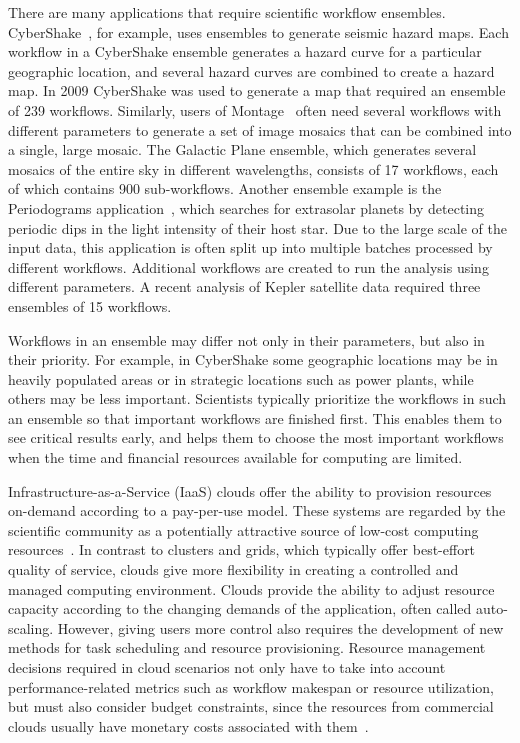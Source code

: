 \documentclass[conference]{IEEEtran}
\begin{document}
There are many applications that require scientific workflow ensembles.
CyberShake~\cite{Callaghan2011}, for example, uses ensembles to generate
seismic hazard maps.  Each workflow in a CyberShake ensemble generates a
hazard curve for a particular geographic location, and several hazard curves
are combined to create a hazard map.  In 2009 CyberShake was used to generate
a map that required an ensemble of 239 workflows.  Similarly, users of
Montage~\cite{Deelman2008} often need several workflows  with different
parameters to generate a set of image mosaics that can be combined  into a
single, large mosaic. The Galactic Plane ensemble, which generates several
mosaics of the  entire sky in different wavelengths, consists of 17 workflows,
each of which contains 900 sub-workflows.  Another ensemble example is the
Periodograms application~\cite{Vockler2011}, which searches for extrasolar
planets by detecting periodic dips in the light intensity of their host star.
Due to the large scale of the input data, this application is often split up
into multiple batches processed by different workflows. Additional workflows
are created to run the analysis using different parameters. A recent analysis
of Kepler satellite data required three ensembles of 15 workflows.

Workflows in an ensemble may differ not only in their parameters, but also in
their priority. For example, in CyberShake some geographic locations may be in heavily
populated areas or in strategic locations such as power plants, while others
may be less important. Scientists typically prioritize the workflows in such
an ensemble so that important workflows are finished first. This enables them
to see critical results early, and helps them to choose the most important
workflows when the time and financial resources available for computing are
limited.

Infrastructure-as-a-Service (IaaS) clouds offer the ability to provision 
resources on-demand according to a pay-per-use model. These systems 
are regarded by the scientific community as a potentially attractive source of 
low-cost computing resources~\cite{Ostermann2010, Keahey2009}. In contrast 
to clusters and grids, which typically offer best-effort quality of service, clouds 
give more flexibility in creating a controlled and managed computing environment.
Clouds provide the ability to adjust resource capacity according to the changing
demands of the application, often called auto-scaling. However, giving users 
more control also requires the development of new methods for task 
scheduling and resource provisioning. Resource management decisions required 
in cloud scenarios not only have to take into account performance-related 
metrics such as workflow makespan or resource utilization, but must also consider
budget constraints, since the resources from commercial clouds
usually have monetary costs associated with them~\cite{Durkee2010}.
\end{document}
